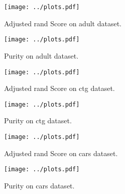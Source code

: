 \documentclass[a4paper]{article}
\begin{document}
\begin{figure}[!hbt]
    \centering
    \texttt{[image: ../plots.pdf]}
    \caption[]{Adjusted rand Score on adult dataset.
    \label{fig:adult_rand}
    }
\end{figure}
\begin{figure}[!hbt]
    \centering
    \texttt{[image: ../plots.pdf]}
    \caption[]{Purity on adult dataset.
    \label{fig:adult_purity}
    }
\end{figure}

\begin{figure}[!hbt]
    \centering
    \texttt{[image: ../plots.pdf]}
    \caption[]{Adjusted rand Score on ctg dataset.
    \label{fig:ctg_rand}
    }
\end{figure}
\begin{figure}[!hbt]
    \centering
    \texttt{[image: ../plots.pdf]}
    \caption[]{Purity on ctg dataset.
    \label{fig:ctg_purity}
    }
\end{figure}

\begin{figure}[!hbt]
    \centering
    \texttt{[image: ../plots.pdf]}
    \caption[]{Adjusted rand Score on cars dataset.
    \label{fig:cars_rand}
    }
\end{figure}
\begin{figure}[!hbt]
    \centering
    \texttt{[image: ../plots.pdf]}
    \caption[]{Purity on cars dataset.
    \label{fig:cars_purity}
    }
\end{figure}
\end{document}
